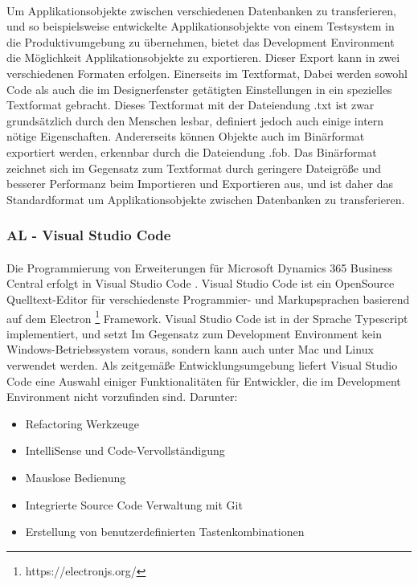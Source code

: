 \paragraph{}
Um Applikationsobjekte zwischen verschiedenen Datenbanken zu transferieren, und so beispielsweise entwickelte Applikationsobjekte von einem Testsystem in die Produktivumgebung zu übernehmen, bietet das Development Environment die Möglichkeit Applikationsobjekte zu exportieren. Dieser Export kann in zwei verschiedenen Formaten erfolgen. Einerseits im Textformat, Dabei werden sowohl Code als auch die im Designerfenster getätigten Einstellungen in ein spezielles Textformat gebracht. Dieses Textformat mit der Dateiendung .txt ist zwar grundsätzlich durch den Menschen lesbar, definiert jedoch auch einige intern nötige Eigenschaften. Andererseits können Objekte auch im Binärformat exportiert werden, erkennbar durch die Dateiendung .fob. Das Binärformat zeichnet sich im Gegensatz zum Textformat durch geringere Dateigröße und besserer Performanz beim Importieren und Exportieren aus, und ist daher das Standardformat um Applikationsobjekte zwischen Datenbanken zu transferieren.
\pagebreak
\subsubsection{AL - Visual Studio Code}
\paragraph{}
Die Programmierung von Erweiterungen für Microsoft Dynamics 365 Business Central erfolgt in Visual Studio Code \cite{KahlertGiza2016}. Visual Studio Code ist ein OpenSource Quelltext-Editor für verschiedenste Programmier- und Markupsprachen basierend auf dem Electron \footnote{https://electronjs.org/} Framework. Visual Studio Code ist in der Sprache Typescript implementiert, und setzt Im Gegensatz zum Development Environment kein Windows-Betriebssystem voraus, sondern kann auch unter Mac und Linux verwendet werden. Als zeitgemäße Entwicklungsumgebung liefert Visual Studio Code eine Auswahl einiger Funktionalitäten für Entwickler, die im Development Environment nicht vorzufinden sind. Darunter:

\begin{itemize}
	\item Refactoring Werkzeuge
	\item IntelliSense und Code-Vervollständigung
	\item Mauslose Bedienung
	\item Integrierte Source Code Verwaltung mit Git
	\item Erstellung von benutzerdefinierten Tastenkombinationen
\end{itemize}

